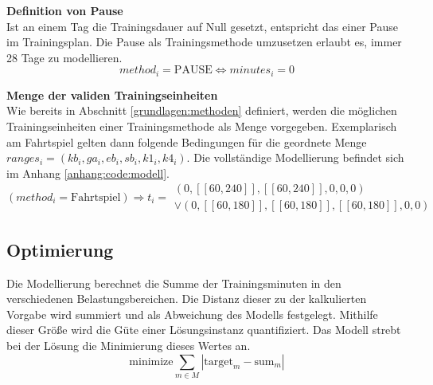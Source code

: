 \textbf{Definition von Pause} \\[0.2em]
Ist an einem Tag die Trainingsdauer auf Null gesetzt, entspricht das einer Pause im Trainingsplan. Die Pause als Trainingsmethode umzusetzen erlaubt es, immer 28 Tage zu modellieren.
\begin{equation}
    method_i = \text{PAUSE} \Leftrightarrow minutes_i = 0
\end{equation}

\textbf{Menge der validen Trainingseinheiten} \\[0.2em]
Wie bereits in Abschnitt \ref{grundlagen:methoden} definiert, werden die möglichen Trainingseinheiten einer Trainingsmethode als Menge vorgegeben. Exemplarisch am Fahrtspiel gelten dann folgende Bedingungen für die geordnete Menge $ranges_i = (kb_i, ga_i, eb_i, sb_i, k1_i, k4_i)$. Die vollständige Modellierung befindet sich im Anhang \ref{anhang:code:modell}.
\begin{equation}
    (method_i = \text{Fahrtspiel})\Rightarrow t_i = \begin{array}{c}
            (0, [\![60, 240]\!], [\![60, 240]\!], 0, 0, 0) \\ 
        \vee (0, [\![60,180]\!], [\![60, 180]\!], [\![60, 180]\!], 0, 0)
    \end{array}
\end{equation}

\subsection{Optimierung}
Die Modellierung berechnet die Summe der Trainingsminuten in den verschiedenen Belastungsbereichen. Die Distanz dieser zu der kalkulierten Vorgabe wird summiert und als Abweichung des Modells festgelegt. Mithilfe dieser Größe wird die Güte einer Lösungsinstanz quantifiziert. Das Modell strebt bei der Lösung die Minimierung dieses Wertes an.
\begin{equation}
    \text{minimize} \sum_{m\in M} |\text{target}_m - \text{sum}_m|
\end{equation} 


